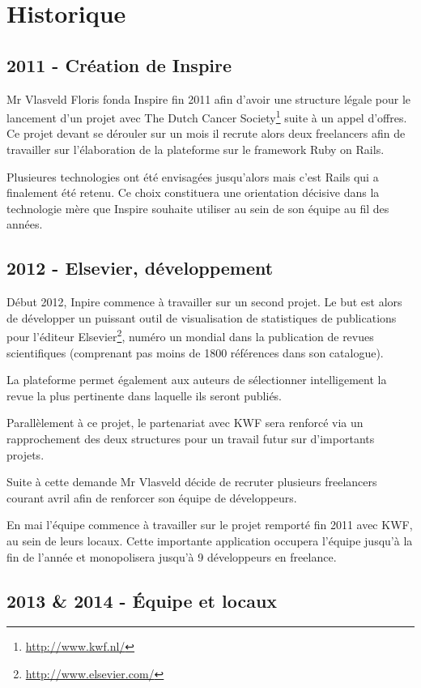 \documentclass[12pt,a4paper]{book}
\begin{document}
\section{Historique}
\subsection{2011 - Création de Inspire}

Mr Vlasveld Floris fonda Inspire fin 2011 afin d'avoir une structure légale pour le lancement d'un projet avec The Dutch Cancer Society\footnote{\url{http://www.kwf.nl/}} suite à un appel d'offres. Ce projet devant se dérouler sur un mois il recrute alors deux freelancers afin de travailler sur l'élaboration de la plateforme sur le framework Ruby on Rails.

Plusieures technologies ont été envisagées jusqu'alors mais c'est Rails qui a finalement été retenu. Ce choix constituera une orientation décisive dans la technologie mère que Inspire souhaite utiliser au sein de son équipe au fil des années.

\subsection{2012 - Elsevier, développement}

Début 2012, Inpire commence à travailler sur un second projet. Le but est alors de développer un puissant outil de visualisation de statistiques de publications pour l'éditeur Elsevier\footnote{\url{http://www.elsevier.com/}}, numéro un mondial dans la publication de revues scientifiques (comprenant pas moins de 1800 références dans son catalogue).

La plateforme permet également aux auteurs de sélectionner intelligement la revue la plus pertinente dans laquelle ils seront publiés.

Parallèlement à ce projet, le partenariat avec KWF sera renforcé via un rapprochement des deux structures pour un travail futur sur d'importants projets.

Suite à cette demande Mr Vlasveld décide de recruter plusieurs freelancers courant avril afin de renforcer son équipe de développeurs.

En mai l'équipe commence à travailler sur le projet remporté fin 2011 avec KWF, au sein de leurs locaux. Cette importante application occupera l'équipe jusqu'à la fin de l'année et monopolisera jusqu'à 9 développeurs en freelance.

\subsection{2013 \& 2014 - Équipe et locaux}
\end{document}
